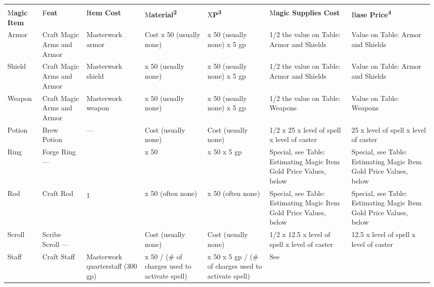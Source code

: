 \documentclass{article}
\begin{document}
\vspace{12pt}
\begin{tabular}{|>{\raggedright}p{30pt}|>{\raggedright}p{40pt}|>{\raggedright}p{29pt}|>{\raggedright}p{34pt}|>{\raggedright}p{33pt}|>{\raggedright}p{47pt}|>{\raggedright}p{49pt}|}
\hline
\multicolumn{7}{|p{266pt}|}{T\textbf{able: Summary of Magic Item Creation Costs}}\tabularnewline
\hline
  &   &   & \multicolumn{2}{p{68pt}|}{S\textbf{pell Component Costs}} &  & \tabularnewline
\hline
M\textbf{agic Item } & F\textbf{eat } & I\textbf{tem Cost } & M\textbf{aterial}\textsuperscript{\textbf{2}}\textbf{ 
} & X\textbf{P}\textsuperscript{\textbf{3}}\textbf{ } & M\textbf{agic Supplies 
Cost } & B\textbf{ase Price}\textsuperscript{\textbf{4}}\tabularnewline
\hline
Armor  & Craft Magic Arms and Armor & Masterwork armor  & Cost x 50 (usually none) & x 
50 (usually none) \linebreak{}
x 5 gp & 1/2 the value on Table: Armor and Shields & Value on Table: Armor and 
Shields\tabularnewline
\hline
Shield   & Craft Magic Arms and Armor & Masterwork shield  & x 50 (usually none) & x$ $ 
50 (usually none) \linebreak{}
x 5 gp & 1/2 the value on Table: Armor and Shields & Value on Table: Armor and 
Shields\tabularnewline
\hline
Weapon  & Craft Magic Arms and Armor & Masterwork weapon  & x 50 (usually none) 
 & x 50 (usually none) \linebreak{}
x 5 gp & 1/2 the value on Table: Weapons  & Value on Table: Weapons\tabularnewline
\hline
Potion  & Brew Potion &  ---  & Cost (usually none)  & Cost (usually none)  & 1/2 
x 25 x level of spell x level of caster & 25 x level of spell x level of caster\tabularnewline
\hline
Ring  & Forge Ring --- &  &  x 50  & x 50 \linebreak{}
x 5 gp & Special, see Table: Estimating Magic Item Gold Price Values, below & Special, 
see Table: Estimating Magic Item Gold Price Values, below\tabularnewline
\hline
Rod  & Craft Rod  & 1\textsuperscript{\textbf{ }} & x 50 (often none) & x 50 (often 
none)  & Special, see Table: Estimating Magic Item Gold Price Values, below & Special, 
see Table: Estimating Magic Item Gold Price Values, below\tabularnewline
\hline
Scroll  & Scribe Scroll --- &   & Cost (usually none)  & Cost (usually none)  & 1/2 
x 12.5 x level of spell x level of caster & 12.5 x level of spell x level of caster\tabularnewline
\hline
Staff  & Craft Staff  & Masterwork quarterstaff (300 gp) & x 50 / (\# of charges 
used to activate spell) & x 50 x 5 gp / (\# of charges used to activate spell) & See 

\end{tabular}
\end{document}
